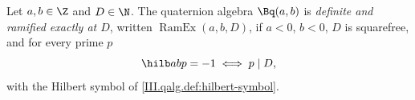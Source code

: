 Let $a,b\in\Z$ and $D\in\N$. The quaternion algebra $\Bq(a,b)$ is \emph{definite and ramified exactly at $D$}, written $\operatorname{RamEx}(a,b,D)$,
if $a<0$, $b<0$, $D$ is squarefree, and for every prime $p$
\[
  \hilb abp=-1\iff p\mid D,
\]
with the Hilbert symbol of \cref{III.qalg.def:hilbert-symbol}.
